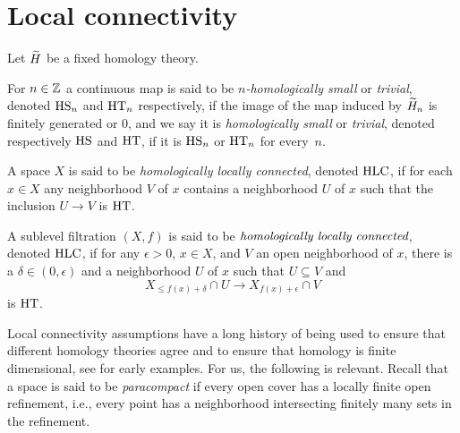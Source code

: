 
\section{Local connectivity}

Let $\widetilde{H}$ be a fixed homology theory.

\begin{defi} \label{defi:local_connectedness}
	For $n \in \mathbb{Z}$ a continuous map is said to be \textit{$n$-homologically small} or \textit{trivial}, denoted $\mathrm{HS}_n$ and $\mathrm{HT}_n$ respectively, if the image of the map induced by $\widetilde{H}_n$ is finitely generated or 0, and we say it is \textit{homologically small} or \textit{trivial}, denoted respectively $\mathrm{HS}$ and $\mathrm{HT}$, if it is $\mathrm{HS}_n$ or $\mathrm{HT}_n$ for every~$n$.
\end{defi}

\begin{defi}
	A space $X$ is said to be \emph{homologically locally connected}, denoted $\mathrm{HLC}$, if for each $x \in X$ any neighborhood $V$ of $x$ contains a neighborhood $U$ of $x$ such that the inclusion $U \to V$ is $\mathrm{HT}$.
	
	A sublevel filtration $(X,f)$ is said to be $\emph{homologically locally connected}$, denoted $\mathrm{HLC}$, if for any $\epsilon > 0$, $x \in X$, and $V$ an open neighborhood of $x$, there is a $\delta \in (0, \epsilon)$ and a neighborhood $U$ of $x$ such that $U \subseteq V$ and
	\begin{equation*}
	X_{\leq f(x) + \delta} \cap U \to X_{f(x) + \epsilon} \cap V
	\end{equation*}
	is $\mathrm{HT}$.
\end{defi}


Local connectivity assumptions have a long history of being used to ensure that different homology theories agree and to ensure that homology is finite dimensional, see \cite{MR0007094} for early examples.
For us, the following is relevant.
Recall that a space is said to be \textit{paracompact} if every open cover has a locally finite open refinement, i.e., every point has a neighborhood intersecting finitely many sets in the refinement.

